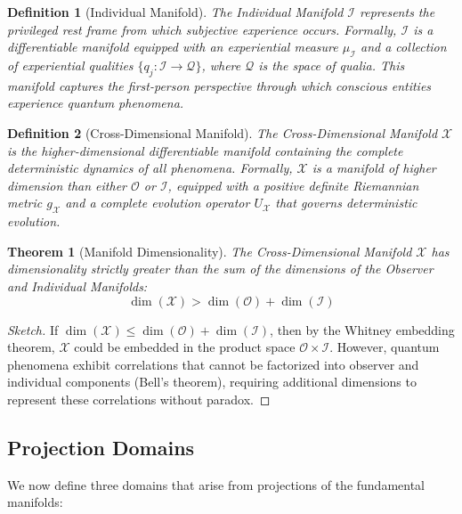 \documentclass{article}
\newtheorem{definition}{Definition}
\newtheorem{theorem}{Theorem}
\begin{document}
\begin{definition}[Individual Manifold]
The Individual Manifold $\mathcal{I}$ represents the privileged rest frame from which subjective experience occurs. Formally, $\mathcal{I}$ is a differentiable manifold equipped with an experiential measure $\mu_\mathcal{I}$ and a collection of experiential qualities $\{q_j: \mathcal{I} \rightarrow \mathcal{Q}\}$, where $\mathcal{Q}$ is the space of qualia. This manifold captures the first-person perspective through which conscious entities experience quantum phenomena.
\end{definition}

\begin{definition}[Cross-Dimensional Manifold]
The Cross-Dimensional Manifold $\mathcal{X}$ is the higher-dimensional differentiable manifold containing the complete deterministic dynamics of all phenomena. Formally, $\mathcal{X}$ is a manifold of higher dimension than either $\mathcal{O}$ or $\mathcal{I}$, equipped with a positive definite Riemannian metric $g_{\mathcal{X}}$ and a complete evolution operator $U_\mathcal{X}$ that governs deterministic evolution.
\end{definition}

\begin{theorem}[Manifold Dimensionality]
The Cross-Dimensional Manifold $\mathcal{X}$ has dimensionality strictly greater than the sum of the dimensions of the Observer and Individual Manifolds:
\begin{equation}
\dim(\mathcal{X}) > \dim(\mathcal{O}) + \dim(\mathcal{I})
\end{equation}
\end{theorem}

\begin{proof}[Sketch]
If $\dim(\mathcal{X}) \leq \dim(\mathcal{O}) + \dim(\mathcal{I})$, then by the Whitney embedding theorem, $\mathcal{X}$ could be embedded in the product space $\mathcal{O} \times \mathcal{I}$. However, quantum phenomena exhibit correlations that cannot be factorized into observer and individual components (Bell's theorem), requiring additional dimensions to represent these correlations without paradox.
\end{proof}

\subsection{Projection Domains}

We now define three domains that arise from projections of the fundamental manifolds:
\end{document}
